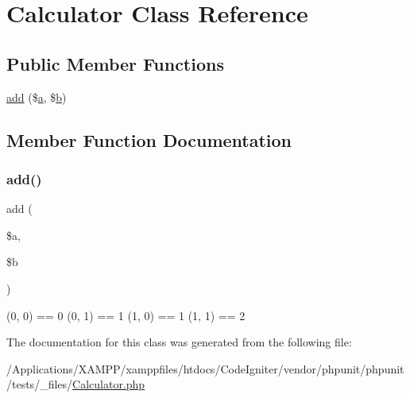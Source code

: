 \hypertarget{class_calculator}{}\section{Calculator Class Reference}
\label{class_calculator}
\subsection*{Public Member Functions}
\begin{DoxyCompactItemize}
\item 
\mbox{\hyperlink{class_calculator_a40661040ccfdf7cffcf8b975a96a78c7}{add}} (\$\mbox{\hyperlink{interfacea}{a}}, \$\mbox{\hyperlink{interfaceb}{b}})
\end{DoxyCompactItemize}


\subsection{Member Function Documentation}
\mbox{\label{class_calculator_a40661040ccfdf7cffcf8b975a96a78c7}} 
\subsubsection{\texorpdfstring{add()}{add()}}
{\footnotesize\ttfamily add (\begin{DoxyParamCaption}\item[{}]{\$a,  }\item[{}]{\$b }\end{DoxyParamCaption})}

(0, 0) == 0  (0, 1) == 1  (1, 0) == 1  (1, 1) == 2 

The documentation for this class was generated from the following file\+:\begin{DoxyCompactItemize}
\item 
/\+Applications/\+X\+A\+M\+P\+P/xamppfiles/htdocs/\+Code\+Igniter/vendor/phpunit/phpunit/tests/\+\_\+files/\mbox{\hyperlink{_calculator_8php}{Calculator.\+php}}\end{DoxyCompactItemize}
